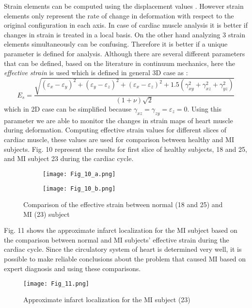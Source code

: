 \documentclass{jicspack}
\begin{document}
Strain elements can be computed using the displacement values . However strain elements only represent the rate of change in deformation with respect to the original configuration in each axis. In case of cardiac muscle analysis it is better if changes in strain is treated in a local basis. On the other hand analyzing 3 strain elements simultaneously can be confusing. Therefore it is better if a unique parameter is defined for analysis. Although there are several different parameters that can be defined, based on the literature in continuum mechanics, here the \textit{effective strain} is used which is defined in general 3D case as \cite{21}: 
\begin{equation}
E_s=\frac{\sqrt{(\varepsilon_x-\varepsilon_y)^2+(\varepsilon_y-\varepsilon_z)^2+(\varepsilon_x-\varepsilon_z)^2+1.5(\gamma_{xy}^2+\gamma_{xz}^2+\gamma_{yz}^2)}}{(1+\nu)\sqrt{2}}
\end{equation}
which in 2D case can be simplified because $\gamma_{xz}=\gamma_{zy}=\varepsilon_z=0$.  Using this parameter we are
able to monitor the changes in strain maps of heart muscle during deformation.
Computing effective strain values for different slices of cardiac muscle, these values are used
for comparison between healthy and MI subjects. Fig. 10 represent the results for
first slice of healthy subjects, 18 and 25, and MI subject 23 during the cardiac cycle.

\begin{figure}
\centering
\begin{subfigure}[b]{.45\textwidth}
\texttt{[image: Fig\_10\_a.png]}
\caption{}
\end{subfigure}

\begin{subfigure}[b]{0.45\textwidth}
\texttt{[image: Fig\_10\_b.png]}
\caption{}
\end{subfigure}
\caption{Comparison of the effective strain between normal (18 and 25) and MI (23) subject}
\end{figure}

Fig. 11 shows the approximate infarct localization for the MI subject based on the comparison between normal and MI subjects' effective strain during the cardiac cycle. Since the circulatory system of heart is determined very well, it is possible to make reliable conclusions about the problem that caused MI based on expert diagnosis and using these comparisons.  

\begin{figure}
\centering
\texttt{[image: Fig\_11.png]}
\caption{Approximate infarct localization for the MI subject (23)}
\end{figure}
\end{document}
